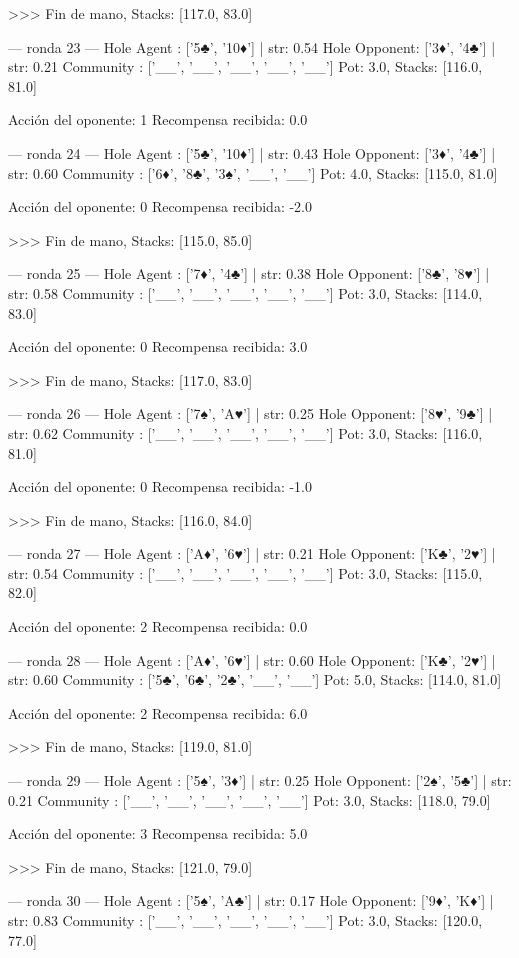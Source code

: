 >>> Fin de mano, Stacks: [117.0, 83.0]


--- ronda 23 ---
Hole Agent : ['5♣', '10♦'] | str: 0.54
Hole Opponent: ['3♦', '4♣'] | str: 0.21
Community  : ['__', '__', '__', '__', '__']
Pot: 3.0, Stacks: [116.0, 81.0]

Acción del oponente: 1
Recompensa recibida: 0.0

--- ronda 24 ---
Hole Agent : ['5♣', '10♦'] | str: 0.43
Hole Opponent: ['3♦', '4♣'] | str: 0.60
Community  : ['6♦', '8♣', '3♠', '__', '__']
Pot: 4.0, Stacks: [115.0, 81.0]

Acción del oponente: 0
Recompensa recibida: -2.0

>>> Fin de mano, Stacks: [115.0, 85.0]


--- ronda 25 ---
Hole Agent : ['7♦', '4♣'] | str: 0.38
Hole Opponent: ['8♣', '8♥'] | str: 0.58
Community  : ['__', '__', '__', '__', '__']
Pot: 3.0, Stacks: [114.0, 83.0]

Acción del oponente: 0
Recompensa recibida: 3.0

>>> Fin de mano, Stacks: [117.0, 83.0]


--- ronda 26 ---
Hole Agent : ['7♠', 'A♥'] | str: 0.25
Hole Opponent: ['8♥', '9♣'] | str: 0.62
Community  : ['__', '__', '__', '__', '__']
Pot: 3.0, Stacks: [116.0, 81.0]

Acción del oponente: 0
Recompensa recibida: -1.0

>>> Fin de mano, Stacks: [116.0, 84.0]


--- ronda 27 ---
Hole Agent : ['A♦', '6♥'] | str: 0.21
Hole Opponent: ['K♣', '2♥'] | str: 0.54
Community  : ['__', '__', '__', '__', '__']
Pot: 3.0, Stacks: [115.0, 82.0]

Acción del oponente: 2
Recompensa recibida: 0.0

--- ronda 28 ---
Hole Agent : ['A♦', '6♥'] | str: 0.60
Hole Opponent: ['K♣', '2♥'] | str: 0.60
Community  : ['5♣', '6♣', '2♣', '__', '__']
Pot: 5.0, Stacks: [114.0, 81.0]

Acción del oponente: 2
Recompensa recibida: 6.0

>>> Fin de mano, Stacks: [119.0, 81.0]


--- ronda 29 ---
Hole Agent : ['5♠', '3♦'] | str: 0.25
Hole Opponent: ['2♠', '5♣'] | str: 0.21
Community  : ['__', '__', '__', '__', '__']
Pot: 3.0, Stacks: [118.0, 79.0]

Acción del oponente: 3
Recompensa recibida: 5.0

>>> Fin de mano, Stacks: [121.0, 79.0]


--- ronda 30 ---
Hole Agent : ['5♠', 'A♣'] | str: 0.17
Hole Opponent: ['9♦', 'K♦'] | str: 0.83
Community  : ['__', '__', '__', '__', '__']
Pot: 3.0, Stacks: [120.0, 77.0]

